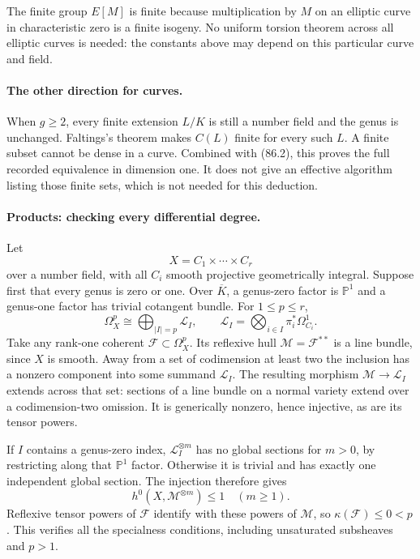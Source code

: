 \documentclass[11pt]{article}
\begin{document}
The finite group $E[M]$ is finite because multiplication by $M$ on an elliptic curve in characteristic zero is a finite isogeny. No uniform torsion theorem across all elliptic curves is needed: the constants above may depend on this particular curve and field.

\paragraph{The other direction for curves.}
When $g\ge2$, every finite extension $L/K$ is still a number field and the genus is unchanged. Faltings's theorem makes $C(L)$ finite for every such $L$. A finite subset cannot be dense in a curve. Combined with (86.2), this proves the full recorded equivalence in dimension one. It does not give an effective algorithm listing those finite sets, which is not needed for this deduction.

\paragraph{Products: checking every differential degree.}
Let
\[
 X=C_1\times\cdots\times C_r
\]
over a number field, with all $C_i$ smooth projective geometrically integral. Suppose first that every genus is zero or one. Over $\overline K$, a genus-zero factor is $\mathbb P^1$ and a genus-one factor has trivial cotangent bundle. For $1\le p\le r$,
\[
 \Omega_X^p\cong\bigoplus_{|I|=p}\mathcal L_I,
 \qquad
 \mathcal L_I=\bigotimes_{i\in I}\pi_i^*\Omega^1_{C_i}.
 \tag{86.3}
\]
Take any rank-one coherent $\mathcal F\subset\Omega_X^p$. Its reflexive hull $\mathcal M=\mathcal F^{**}$ is a line bundle, since $X$ is smooth. Away from a set of codimension at least two the inclusion has a nonzero component into some summand $\mathcal L_I$. The resulting morphism $\mathcal M\to\mathcal L_I$ extends across that set: sections of a line bundle on a normal variety extend over a codimension-two omission. It is generically nonzero, hence injective, as are its tensor powers.

If $I$ contains a genus-zero index, $\mathcal L_I^{\otimes m}$ has no global sections for $m>0$, by restricting along that $\mathbb P^1$ factor. Otherwise it is trivial and has exactly one independent global section. The injection therefore gives
\[
 h^0(X,\mathcal M^{\otimes m})\le1\quad(m\ge1).
\]
Reflexive tensor powers of $\mathcal F$ identify with these powers of $\mathcal M$, so $\kappa(\mathcal F)\le0<p$. This verifies all the specialness conditions, including unsaturated subsheaves and $p>1$.
\end{document}
